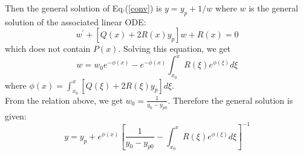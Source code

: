 \documentclass{article}
\begin{document}
Then the general solution of Eq.(\ref{conv}) is $y = y _ { p } + 1 / w$ where $w$ is the general solution of the associated linear ODE:
\begin{equation}
w ^ { \prime } + \left[ Q ( x ) + 2 R ( x ) y _ { p } \right] w + R ( x ) = 0
\end{equation}
which does not contain $P(x)$. Solving this equation, we get
$$w = w _ { 0 } e ^ { - \phi ( x ) } -e ^ { - \phi ( x ) } \int _ { x _ { 0 } } ^ { x } R ( \xi ) e ^ { \phi ( \xi ) } d \xi$$ 
where $\phi ( x ) = \int _ { x _ { 0 } } ^ { x } \left[ Q ( \xi ) + 2 R ( \xi ) y _ { p } \right] d \xi $.
\\
From the relation above, we get $w _ { 0 } = \frac { 1 } { y _ { 0 } - y _ { p 0 } }$.	Therefore the general solution is given:
\begin{equation}
y = y _ { p } + e ^ { \phi ( x ) } \left[ \frac { 1 } { y _ { 0 } - y _ { p0 } } - \int _ { x _ { 0 } } ^ { x } R ( \xi ) e ^ { \phi ( \xi ) } d \xi \right] ^ { - 1 }
\end{equation}




\end{document}
